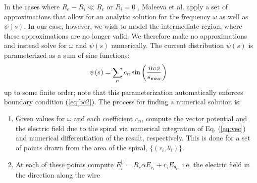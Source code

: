 \documentclass[a4paper, amsfonts, amssymb, amsmath, reprint, showkeys, nofootinbib, twoside]{revtex4-1}
\begin{document}
In the cases where $R_e - R_i \ll R_e$ \cite{maleeva_electrodynamics_2014} or $R_i = 0$ \cite{maleeva_electrodynamics_2015}, Maleeva et al. apply a set of approximations that allow for an analytic solution for the frequency $\omega$ as well as $\psi(s)$.
In our case, however, we wish to model the intermediate region, where these approximations are no longer valid.
We therefore make no approximations and instead solve for $\omega$ and $\psi(s)$ numerically.
The current distribution $\psi(s)$ is parameterized as a sum of sine functions:
\[
    \psi(s) = \sum_n c_n \sin \left ( \frac {n \pi s} {s_{\rm max}} \right )
\]
up to some finite order; note that this parameterization automatically enforces boundary condition (\ref{eq:bc2}).
The process for finding a numerical solution is:
\begin{enumerate}
    \item Given values for $\omega$ and each coefficient $c_n$, compute the vector potential and the electric field due to the spiral via numerical integration of Eq. (\ref{eq:vec}) and numerical differentiation of the result, respectively.
        This is done for a set of points drawn from the area of the spiral, $\{(r_i, \theta_i)\}$.
    \item At each of these points compute $E_i^{||} = R_e \alpha E_{r_i} + r_i E_{\theta_i}$, i.e. the electric field in the direction along the wire
\end{enumerate}


\end{document}

